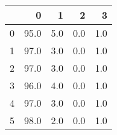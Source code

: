 \begin{tabular}{lrrrr}
\toprule
{} &     0 &    1 &    2 &    3 \\
\midrule
0 &  95.0 &  5.0 &  0.0 &  1.0 \\
1 &  97.0 &  3.0 &  0.0 &  1.0 \\
2 &  97.0 &  3.0 &  0.0 &  1.0 \\
3 &  96.0 &  4.0 &  0.0 &  1.0 \\
4 &  97.0 &  3.0 &  0.0 &  1.0 \\
5 &  98.0 &  2.0 &  0.0 &  1.0 \\
\bottomrule
\end{tabular}
